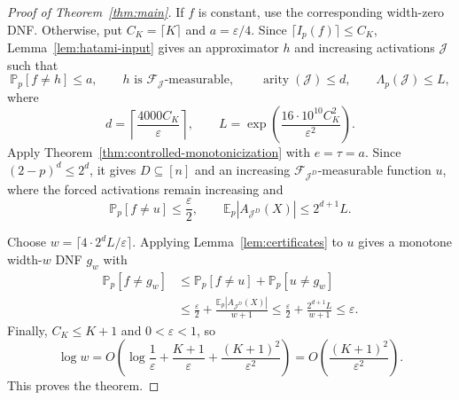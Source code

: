 \documentclass[11pt,letterpaper]{article}
\theoremstyle{definition}
\theoremstyle{remark}
\newcommand{\E}{\mathbb E}
\renewcommand{\Pr}{\mathbb P}
\newcommand{\cF}{\mathcal F}
\newcommand{\cJ}{\mathcal J}
\begin{document}
\begin{proof}[Proof of Theorem~\ref{thm:main}]
If $f$ is constant, use the corresponding width-zero DNF\@.  Otherwise, put $C_K=\lceil K\rceil$ and $a=\varepsilon/4$.
Since $\lceil I_p(f)\rceil\le C_K$, Lemma~\ref{lem:hatami-input} gives an
approximator $h$ and increasing
activations $\cJ$ such that
\[
  \Pr_p[f\ne h]\le a,
  \qquad
  h\text{ is }\cF_{\cJ}\text{-measurable},
  \qquad
  \operatorname{arity}(\cJ)\le d,
  \qquad
  \Lambda_p(\cJ)\le L,
\]
where
\[
  d=\left\lceil\frac{4000C_K}{\varepsilon}\right\rceil,
  \qquad
  L=\exp\!\left(\frac{16\cdot10^{10}C_K^2}{\varepsilon^2}\right).
\]
Apply Theorem~\ref{thm:controlled-monotonicization} with $e=\tau=a$.  Since
$(2-p)^d\le2^d$, it gives $D\subseteq[n]$ and an increasing
$\cF_{\cJ^D}$-measurable function $u$, where the forced activations remain
increasing and
\[
       \Pr_p[f\ne u]\le\frac{\varepsilon}{2},
       \qquad
       \E_p|A_{\cJ^D}(X)|\le2^{d+1}L.
\]

Choose $w=\lceil 4\cdot 2^d L/\varepsilon\rceil$.  Applying Lemma~\ref{lem:certificates} to $u$ gives a monotone width-$w$ DNF
$g_w$ with
\[
\begin{aligned}
       \Pr_p[f\ne g_w]
       &\le\Pr_p[f\ne u]+\Pr_p[u\ne g_w]\\
       &\le\frac{\varepsilon}{2}
          +\frac{\E_p|A_{\cJ^D}(X)|}{w+1}
       \le\frac{\varepsilon}{2}
          +\frac{2^{d+1}L}{w+1}
       \le\varepsilon.
\end{aligned}
\]
Finally, $C_K\le K+1$ and $0<\varepsilon<1$, so
\[
  \log w
  =O\!\left(
       \log\frac1\varepsilon
       +\frac{K+1}{\varepsilon}
       +\frac{(K+1)^2}{\varepsilon^2}
       \right)
  =O\!\left(\frac{(K+1)^2}{\varepsilon^2}\right).
\]
This proves the theorem.
\end{proof}
\end{document}
